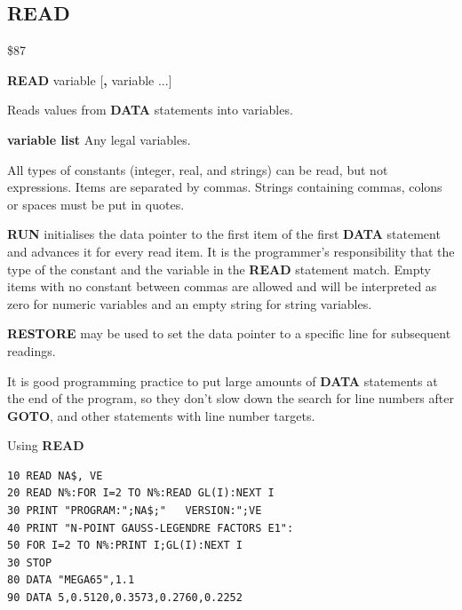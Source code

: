 \subsection{READ}
\begin{description}[leftmargin=2cm,style=nextline]
\item [Token:] \$87
\item [Format:] {\bf READ} variable [{\bf,} variable ...]
\item [Usage:]  Reads values from {\bf DATA} statements into variables.

               {\bf variable list} Any legal variables.

               All types of constants (integer, real, and
               strings) can be read, but not expressions.
               Items are separated by commas.
               Strings containing commas, colons or spaces must be put
               in quotes.

               {\bf RUN} initialises the data pointer
               to the first item of the first {\bf DATA} statement
               and advances it for every read item. It is the
               programmer's responsibility that the type of
               the constant and the variable in the {\bf READ}
               statement match. Empty items with no constant
               between commas are allowed and will be interpreted as
               zero for numeric variables and an empty string for
               string variables.

               {\bf RESTORE} may be used to set the
               data pointer to a specific line for subsequent
               readings.

\item [Remarks:] It is good programming practice to put large amounts of
                 {\bf DATA} statements at the end of the program,
                 so they don't slow down the search for line numbers
                 after {\bf GOTO}, and other statements with line number targets.

\item [Example:] Using {\bf READ}
\begin{tcolorbox}[colback=black,coltext=white]
\verbatimfont{\codefont}
\begin{verbatim}
10 READ NA$, VE
20 READ N%:FOR I=2 TO N%:READ GL(I):NEXT I
30 PRINT "PROGRAM:";NA$;"   VERSION:";VE
40 PRINT "N-POINT GAUSS-LEGENDRE FACTORS E1":
50 FOR I=2 TO N%:PRINT I;GL(I):NEXT I
30 STOP
80 DATA "MEGA65",1.1
90 DATA 5,0.5120,0.3573,0.2760,0.2252
\end{verbatim}
\end{tcolorbox}
\end{description}

